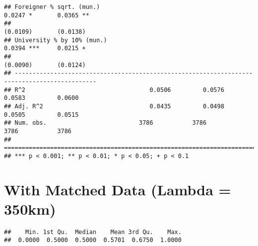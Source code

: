 \documentclass[
]{article}
\newenvironment{Shaded}{\begin{snugshade}}{\end{snugshade}}
\newcommand{\DecValTok}[1]{\textcolor[rgb]{0.00,0.00,0.81}{#1}}
\newcommand{\FloatTok}[1]{\textcolor[rgb]{0.00,0.00,0.81}{#1}}
\newcommand{\KeywordTok}[1]{\textcolor[rgb]{0.13,0.29,0.53}{\textbf{#1}}}
\newcommand{\NormalTok}[1]{#1}
\newcommand{\OperatorTok}[1]{\textcolor[rgb]{0.81,0.36,0.00}{\textbf{#1}}}
\newcommand{\StringTok}[1]{\textcolor[rgb]{0.31,0.60,0.02}{#1}}
\begin{document}
\begin{verbatim}
## Foreigner % sqrt. (mun.)                                            0.0247 *       0.0365 ** 
##                                                                    (0.0109)       (0.0138)   
## University % by 10% (mun.)                                          0.0394 ***     0.0215 +  
##                                                                    (0.0090)       (0.0124)   
## ---------------------------------------------------------------------------------------------
## R^2                                   0.0506         0.0576         0.0583         0.0600    
## Adj. R^2                              0.0435         0.0498         0.0505         0.0515    
## Num. obs.                          3786           3786           3786           3786         
## =============================================================================================
## *** p < 0.001; ** p < 0.01; * p < 0.05; + p < 0.1
\end{verbatim}

\hypertarget{with-matched-data-lambda-350km}{%
\section{With Matched Data (Lambda =
350km)}\label{with-matched-data-lambda-350km}}

\begin{Shaded}
\end{Shaded}

\begin{verbatim}
##    Min. 1st Qu.  Median    Mean 3rd Qu.    Max. 
##  0.0000  0.5000  0.5000  0.5701  0.6750  1.0000
\end{verbatim}

\begin{Shaded}
\end{Shaded}
\end{document}
